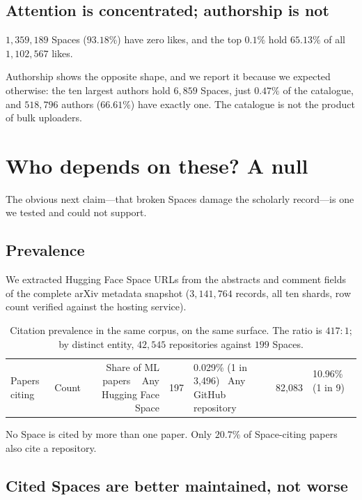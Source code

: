 \documentclass[11pt]{article}
\begin{document}
\subsection{Attention is concentrated; authorship is not}

$1{,}359{,}189$ Spaces ($93.18\%$) have zero likes, and the top $0.1\%$ hold
$65.13\%$ of all $1{,}102{,}567$ likes.

Authorship shows the opposite shape, and we report it because we expected
otherwise: the ten largest authors hold $6{,}859$ Spaces, just $0.47\%$ of the
catalogue, and $518{,}796$ authors ($66.61\%$) have exactly one. The catalogue
is not the product of bulk uploaders.



\section{Who depends on these? A null}
\label{sec:citation}

The obvious next claim---that broken Spaces damage the scholarly record---is
one we tested and could not support.

\subsection{Prevalence}

We extracted Hugging Face Space URLs from the abstracts and comment fields of
the complete arXiv metadata snapshot ($3{,}141{,}764$ records, all ten shards,
row count verified against the hosting service).

\begin{table}[h]
\centering
\small
\begin{tabular}{lrr}
\toprule
Papers citing & Count & Share of ML papers \
\midrule
Any Hugging Face Space & 197 & 0.029\% (1 in 3{,}496) \
Any GitHub repository & 82{,}083 & 10.96\% (1 in 9) \
\bottomrule
\end{tabular}
\caption{Citation prevalence in the same corpus, on the same surface. The
ratio is $417{:}1$; by distinct entity, $42{,}545$ repositories against $199$
Spaces.}
\label{tab:prevalence}
\end{table}

No Space is cited by more than one paper. Only $20.7\%$ of Space-citing papers
also cite a repository.

\subsection{Cited Spaces are better maintained, not worse}
\end{document}
